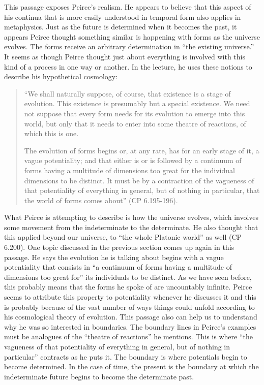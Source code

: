 \noindent This passage exposes Peirce's realism. He appears to believe that this aspect of his continua that is more easily understood in temporal form also applies in metaphysics. Just as the future is determined when it becomes the past, it appears Peirce thought something similar is happening with forms as the universe evolves. The forms receive an arbitrary determination in ``the existing universe.'' It seems as though Peirce thought just about everything is involved with this kind of a process in one way or another. In the lecture, he uses these notions to describe his hypothetical cosmology:
\begin{quotation}
\noindent``We shall naturally suppose, of course, that existence is a stage of evolution. This existence is presumably but a special existence. We need not suppose that every form needs for its evolution to emerge into this world, but only that it needs to enter into some theatre of reactions, of which this is one.

 The evolution of forms begins or, at any rate, has for an early stage of it, a vague potentiality; and that either is or is followed by a continuum of forms having a multitude of dimensions too great for the individual dimensions to be distinct. It must be by a contraction of the vagueness of that potentiality of everything in general, but of nothing in particular, that the world of forms comes about'' (CP 6.195-196).
\end{quotation}
What Peirce is attempting to describe is how the universe evolves, which involves some movement from the indeterminate to the determinate. He also thought that this applied beyond our universe, to ``the whole Platonic world'' as well (CP 6.200). One topic discussed in the previous section comes up again in this passage. He says the evolution he is talking about begins with a vague potentiality that consists in ``a continuum of forms having a multitude of dimensions too great for'' its individuals to be distinct. As we have seen before, this probably means that the forms he spoke of are uncountably infinite. Peirce seems to attribute this property to potentiality whenever he discusses it and this is probably because of the vast number of ways things could unfold according to his cosmological theory of evolution. This passage also can help us to understand why he was so interested in boundaries. The boundary lines in Peirce's examples must be analogues of the ``theatre of reactions'' he mentions. This is where ``the vagueness of that potentiality of everything in general, but of nothing in particular'' contracts as he puts it. The boundary is where potentials begin to become determined. In the case of time, the present is the boundary at which the indeterminate future begins to become the determinate past.

